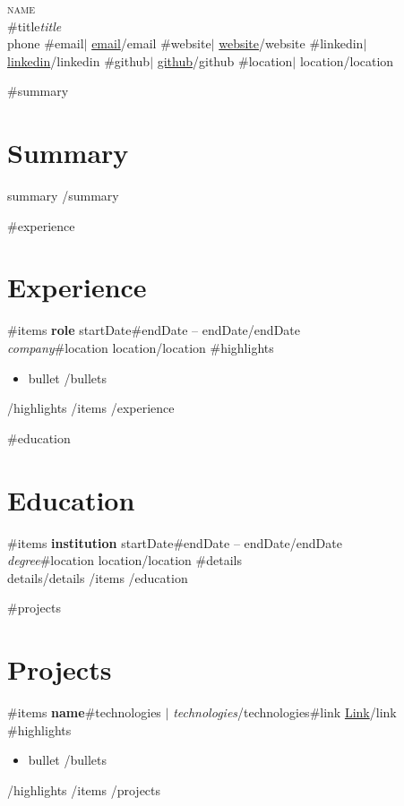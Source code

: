 \documentclass[11pt,a4paper]{article}
\begin{document}
\begin{center}
    {\Huge \scshape {{name}}} \\ \vspace{2pt}
    {{#title}}{\large \textit{{{title}}}} \\ 
    \small {{phone}} {{#email}}$|$ \href{mailto:{{email}}}{{{email}}}{{/email}} {{#website}}$|$ \href{{{website}}}{{{website}}}{{/website}} {{#linkedin}}$|$ \href{https://{{linkedin}}}{{{linkedin}}}{{/linkedin}} {{#github}}$|$ \href{https://{{github}}}{{{github}}}{{/github}} {{#location}}$|$ {{location}}{{/location}}
\end{center}

{{#summary}}
\section{Summary}
{{summary}}
{{/summary}}

{{#experience}}
\section{Experience}
{{#items}}
\textbf{{{role}}} \hfill {{startDate}}{{#endDate}} -- {{endDate}}{{/endDate}} \\
\textit{{{company}}}{{#location}} \hfill {{location}}{{/location}}
{{#highlights}}
\begin{itemize}[noitemsep,topsep=1pt]
{{#bullets}}
    \item {{bullet}}
{{/bullets}}
\end{itemize}
{{/highlights}}
\vspace{4pt}
{{/items}}
{{/experience}}

{{#education}}
\section{Education}
{{#items}}
\textbf{{{institution}}} \hfill {{startDate}}{{#endDate}} -- {{endDate}}{{/endDate}} \\
\textit{{{degree}}}{{#location}} \hfill {{location}}{{/location}}
{{#details}}\\\small {{details}}{{/details}}
\vspace{4pt}
{{/items}}
{{/education}}

{{#projects}}
\section{Projects}
{{#items}}
\textbf{{{name}}}{{#technologies}} $|$ \textit{{{technologies}}}{{/technologies}}{{#link}} \hfill \href{{{link}}}{Link}{{/link}}
{{#highlights}}
\begin{itemize}[noitemsep,topsep=1pt]
{{#bullets}}
    \item {{bullet}}
{{/bullets}}
\end{itemize}
{{/highlights}}
\vspace{4pt}
{{/items}}
{{/projects}}
\end{document}
